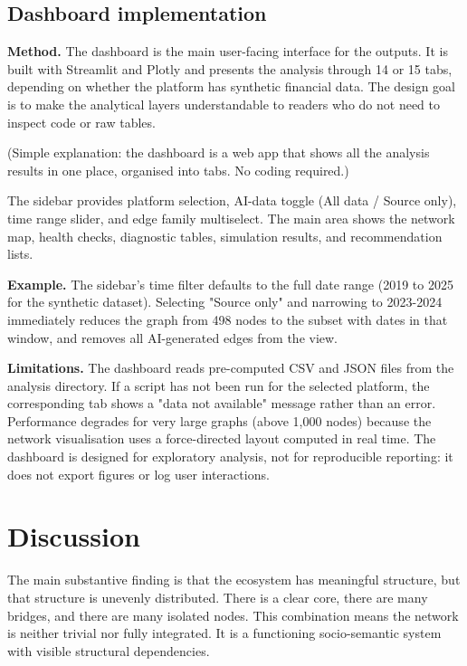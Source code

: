 \documentclass[11pt,a4paper]{article}
\begin{document}
\subsection{Dashboard implementation}

\textbf{Method.} The dashboard is the main user-facing interface for the
outputs. It is built with Streamlit and Plotly and presents the analysis
through 14 or 15 tabs, depending on whether the platform has synthetic
financial data. The design goal is to make the analytical layers
understandable to readers who do not need to inspect code or raw tables.

(Simple explanation: the dashboard is a web app that shows all the
analysis results in one place, organised into tabs. No coding required.)

The sidebar provides platform selection, AI-data toggle (All data /
Source only), time range slider, and edge family multiselect. The main
area shows the network map, health checks, diagnostic tables, simulation
results, and recommendation lists.

\textbf{Example.} The sidebar's time filter defaults to the full date range
(2019 to 2025 for the synthetic dataset). Selecting "Source only" and
narrowing to 2023-2024 immediately reduces the graph from 498 nodes to
the subset with dates in that window, and removes all AI-generated edges
from the view.

\textbf{Limitations.} The dashboard reads pre-computed CSV and JSON files from
the analysis directory. If a script has not been run for the selected
platform, the corresponding tab shows a "data not available" message
rather than an error. Performance degrades for very large graphs (above
1,000 nodes) because the network visualisation uses a force-directed
layout computed in real time. The dashboard is designed for exploratory
analysis, not for reproducible reporting: it does not export figures or
log user interactions.

\section{Discussion}

The main substantive finding is that the ecosystem has meaningful
structure, but that structure is unevenly distributed. There is a clear
core, there are many bridges, and there are many isolated nodes. This
combination means the network is neither trivial nor fully integrated.
It is a functioning socio-semantic system with visible structural
dependencies.
\end{document}
